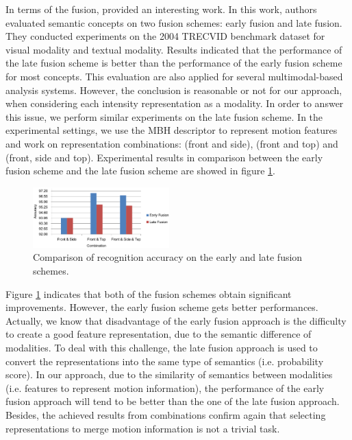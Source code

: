 \documentclass[final,3p,times,twocolumn]{elsarticle}
\begin{document}
In terms of the fusion, \cite{snoek2005early} provided an interesting work. In this work, authors evaluated semantic concepts on two fusion schemes: early fusion and late fusion. They conducted experiments on the 2004 TRECVID benchmark dataset for visual modality and textual modality. Results indicated that the performance of the late fusion scheme is better than the performance of the early fusion scheme for most concepts. This evaluation are also applied for several multimodal-based analysis systems. However, the conclusion is reasonable or not for our approach, when considering each intensity representation as a modality. In order to answer this issue, we perform similar experiments on the late fusion scheme. In the experimental settings, we use the MBH descriptor to represent motion features and work on representation combinations: (front and side), (front and top) and (front, side and top). Experimental results in comparison between the early fusion scheme and the late fusion scheme are showed in figure \ref{lbl:Figure_EarlyLateFusion}.

\begin{figure}[h]
    \centering
    \includegraphics[width=0.47\textwidth]{Chart_EarlyLateFusion.eps}
	\caption{\label{lbl:Figure_EarlyLateFusion}Comparison of recognition accuracy on the early and late fusion schemes.}
\end{figure}

Figure \ref{lbl:Figure_EarlyLateFusion} indicates that both of the fusion schemes obtain significant improvements. However, the early fusion scheme gets better performances. Actually, we know that disadvantage of the early fusion approach is the difficulty to create a good feature representation, due to the semantic difference of modalities. To deal with this challenge, the late fusion approach is used to convert the representations into the same type of semantics (i.e. probability score). In our approach, due to the similarity of semantics between modalities (i.e. features to represent motion information), the performance of the early fusion approach will tend to be better than the one of the late fusion approach. Besides, the achieved results from combinations confirm again that selecting representations to merge motion information is not a trivial task.
\end{document}
